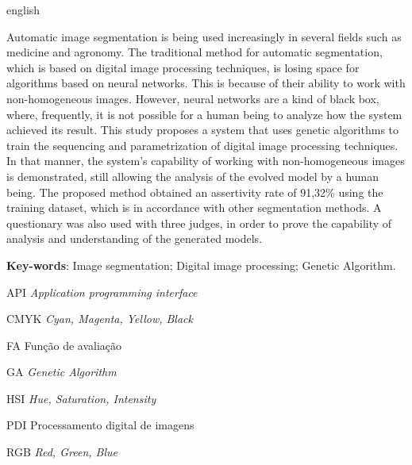 \documentclass[12pt,oneside,a4paper,english,french,spanish,brazil,]{abntex2}
\begin{document}
\begin{resumo}[Abstract]
 \begin{otherlanguage*}{english}

Automatic image segmentation is being used increasingly in several fields such as medicine and agronomy. The traditional method for automatic segmentation, which is based on digital image processing techniques, is losing space for algorithms based on neural networks. This is because of their ability to work with non-homogeneous images. However, neural networks are a kind of black box, where, frequently, it is not possible for a human being to analyze how the system achieved its result. This study proposes a system that uses genetic algorithms to train the sequencing and parametrization of digital image processing techniques. In that manner, the system's capability of working with non-homogeneous images is demonstrated, still allowing the analysis of the evolved model by a human being. The proposed method obtained an assertivity rate of 91,32\% using the training dataset, which is in accordance with other segmentation methods. A questionary was also used with three judges, in order to prove the capability of analysis and understanding of the generated models.

   \vspace{\onelineskip}
 
   \noindent 
   \textbf{Key-words}: Image segmentation; Digital image processing; Genetic Algorithm.
 \end{otherlanguage*}
\end{resumo}

\listoffigures*
\cleardoublepage
{}
\listoftables*
\cleardoublepage
\begin{siglas}
  \item[API] \textit{Application programming interface}
  \item[CMYK] \textit{Cyan, Magenta, Yellow, Black}
  \item[FA] Função de avaliação
  \item[GA] \textit{Genetic Algorithm}
  \item[HSI] \textit{Hue, Saturation, Intensity}
  \item[PDI] Processamento digital de imagens
  \item[RGB] \textit{Red, Green, Blue}
\end{siglas}
\tableofcontents*
\cleardoublepage
\textual
\end{document}
